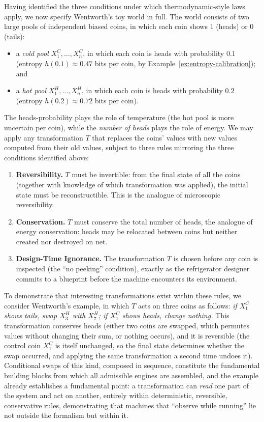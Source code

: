 \documentclass[10pt]{article}
\theoremstyle{definition}
\theoremstyle{remark}
\begin{document}
Having identified the three conditions under which thermodynamic-style laws apply, we now specify Wentworth's toy world in full. The world consists of two large pools of independent biased coins, in which each coin shows $1$ (heads) or $0$ (tails):

\begin{itemize}[leftmargin=2em]
  \item a \emph{cold pool} $X^C_1, \dots, X^C_n$, in which each coin is heads with probability $0.1$ (entropy $h(0.1) \approx 0.47$ bits per coin, by Example~\ref{ex:entropy-calibration}); and
  \item a \emph{hot pool} $X^H_1, \dots, X^H_n$, in which each coin is heads with probability $0.2$ (entropy $h(0.2) \approx 0.72$ bits per coin).
\end{itemize}

The heads-probability plays the role of temperature (the hot pool is more uncertain per coin), while the \emph{number of heads} plays the role of energy. We may apply any transformation $T$ that replaces the coins' values with new values computed from their old values, subject to three rules mirroring the three conditions identified above:

\begin{enumerate}[leftmargin=2em]
  \item \textbf{Reversibility.} $T$ must be invertible: from the final state of all the coins (together with knowledge of which transformation was applied), the initial state must be reconstructible. This is the analogue of microscopic reversibility.
  \item \textbf{Conservation.} $T$ must conserve the total number of heads, the analogue of energy conservation: heads may be relocated between coins but neither created nor destroyed on net.
  \item \textbf{Design-Time Ignorance.} The transformation $T$ is chosen before any coin is inspected (the ``no peeking'' condition), exactly as the refrigerator designer commits to a blueprint before the machine encounters its environment.
\end{enumerate}

To demonstrate that interesting transformations exist within these rules, we consider Wentworth's example, in which $T$ acts on three coins as follows: \emph{if $X^C_1$ shows tails, swap $X^H_3$ with $X^H_7$; if $X^C_1$ shows heads, change nothing.} This transformation conserves heads (either two coins are swapped, which permutes values without changing their sum, or nothing occurs), and it is reversible (the control coin $X^C_1$ is itself unchanged, so the final state determines whether the swap occurred, and applying the same transformation a second time undoes it). Conditional swaps of this kind, composed in sequence, constitute the fundamental building blocks from which all admissible engines are assembled, and the example already establishes a fundamental point: a transformation can \emph{read} one part of the system and act on another, entirely within deterministic, reversible, conservative rules, demonstrating that machines that ``observe while running'' lie not outside the formalism but within it.
\end{document}
